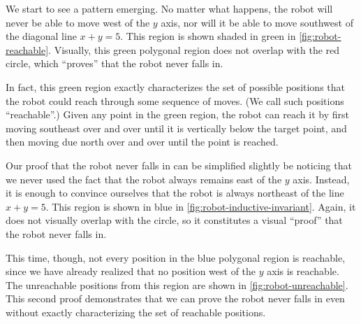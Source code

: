 We start to see a pattern emerging.
No matter what happens,
  the robot will never be able to move west of the $y$ axis,
  nor will it be able to move southwest
    of the diagonal line $x + y = 5$.
This region is shown shaded in green in \cref{fig:robot-reachable}.
Visually, this green polygonal region does not overlap with the red circle,
  which ``proves'' that the robot never falls in.

In fact, this green region exactly characterizes
  the set of possible positions that the robot could reach
  through some sequence of moves.
(We call such positions ``reachable''.)
Given any point in the green region,
  the robot can reach it by first moving southeast over and over until
  it is vertically below the target point,
  and then moving due north over and over until the point is reached.

Our proof that the robot never falls in
  can be simplified slightly be noticing
  that we never used the fact that
  the robot always remains east of the $y$ axis.
Instead, it is enough to convince ourselves that
  the robot is always northeast of the line $x + y = 5$.
This region is shown in blue in \cref{fig:robot-inductive-invariant}.
Again, it does not visually overlap with the circle,
  so it constitutes a visual ``proof'' that the robot never falls in.

This time, though, not every position in the blue polygonal region is reachable,
  since we have already realized that no position west of the $y$ axis is reachable.
The unreachable positions from this region are shown in \cref{fig:robot-unreachable}.
This second proof demonstrates that we can prove the robot never falls in
  even without exactly characterizing the set of reachable positions.

